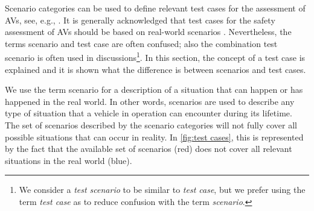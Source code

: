 Scenario categories can be used to define relevant test cases for the assessment of AVs, see, e.g., \cite{ploeg2018cetran,elrofai2016scenario}. It is generally acknowledged that test cases for the safety assessment of AVs should be based on real-world scenarios \cite{putz2017pegasus, roesener2016scenariobased, deGelder2017assessment}. Nevertheless, the terms scenario and test case are often confused; also the combination test scenario is often used in discussions\footnote{We consider a \emph{test scenario} to be similar to \emph{test case}, but we prefer using the term \emph{test case} as to reduce confusion with the term \emph{scenario}.}. In this section, the concept of a test case is explained and it is shown what the difference is between scenarios and test cases.

We use the term scenario for a description of a situation that can happen or has happened in the real world. In other words, scenarios are used to describe any type of situation that a vehicle in operation can encounter during its lifetime. The set of scenarios described by the scenario categories will not fully cover all possible situations that can occur in reality. In \cref{fig:test cases}, this is represented by the fact that the available set of scenarios (red) does not cover all relevant situations in the real world (blue).

